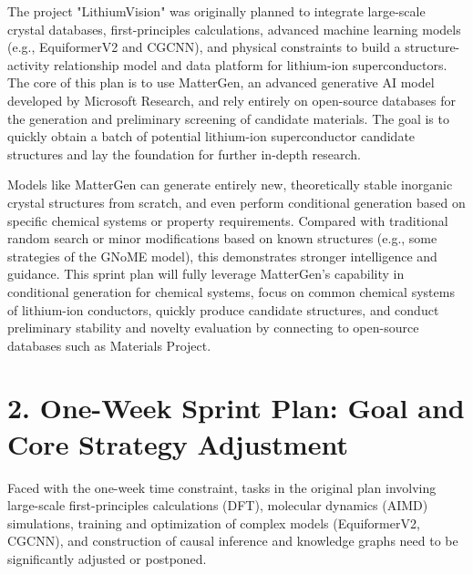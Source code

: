\documentclass[letterpaper]{article} %
\begin{document}
The project "LithiumVision" was originally planned to integrate large-scale crystal databases, first-principles calculations, advanced machine learning models (e.g., EquiformerV2 and CGCNN), and physical constraints to build a structure-activity relationship model and data platform for lithium-ion superconductors. The core of this plan is to use MatterGen, an advanced generative AI model developed by Microsoft Research, and rely entirely on open-source databases for the generation and preliminary screening of candidate materials. The goal is to quickly obtain a batch of potential lithium-ion superconductor candidate structures and lay the foundation for further in-depth research.

Models like MatterGen can generate entirely new, theoretically stable inorganic crystal structures from scratch, and even perform conditional generation based on specific chemical systems or property requirements. Compared with traditional random search or minor modifications based on known structures (e.g., some strategies of the GNoME model), this demonstrates stronger intelligence and guidance. This sprint plan will fully leverage MatterGen's capability in conditional generation for chemical systems, focus on common chemical systems of lithium-ion conductors, quickly produce candidate structures, and conduct preliminary stability and novelty evaluation by connecting to open-source databases such as Materials Project.

\section{2. One-Week Sprint Plan: Goal and Core Strategy Adjustment}

Faced with the one-week time constraint, tasks in the original plan involving large-scale first-principles calculations (DFT), molecular dynamics (AIMD) simulations, training and optimization of complex models (EquiformerV2, CGCNN), and construction of causal inference and knowledge graphs need to be significantly adjusted or postponed.
\end{document}
